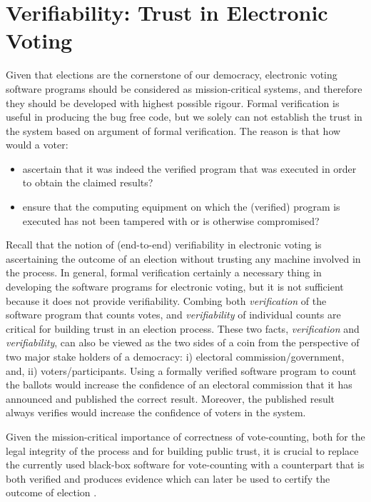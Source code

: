 	
	  
	 
		
 \section{Verifiability: Trust in Electronic Voting}
 \label{secback:varifiability}
 Given that elections are  the cornerstone of our democracy, 
   electronic voting software programs should be considered as mission-critical systems, 
   and therefore they should be developed with highest possible rigour. 
  Formal verification is useful in producing the 
   bug free code, but we solely can not 
   establish the trust in the system based on argument of 
   formal verification. The reason is that how would a voter:
   \begin{itemize}
   \item ascertain that it was indeed the verified program that was
	executed in order to obtain the claimed results?
	
   \item ensure that the computing equipment on which the (verified)
	program is executed has not been tampered with or is otherwise
	compromised?
	
   \end{itemize}
   
   \noindent
   
    Recall that the notion of (end-to-end) verifiability in electronic voting is
 ascertaining the outcome of an election without trusting any 
 machine involved in the process. 
   In general, formal verification certainly a necessary thing 
   in developing the software programs for electronic voting, 
   but it is not sufficient because it does not provide verifiability.
   Combing both \emph{verification} of the
	software program that counts votes, and
	\emph{verifiability} of individual counts are critical for
	building trust in an election process. These two facts, 
	 \emph{verification}  and \emph{verifiability}, 
	 can also be viewed as the
    two sides of a coin from the perspective of two major stake holders of 
    a democracy: i) electoral commission/government, and, ii) voters/participants.  
    Using a formally 
    verified software program to count the ballots would increase the confidence 
    of an electoral commission that it has announced and published the correct result. 
    Moreover,  the published result always verifies would increase the confidence
    of voters in the system. 
	 
	 
	Given the mission-critical importance of
	 correctness of vote-counting,
	both for the legal integrity of the process and for
	building public trust,  it is crucial to replace the
	currently used black-box software for vote-counting with a
	counterpart that is both verified and produces 
	evidence which can later be used to certify
	the outcome of election \citep{Bernhard:2017:PES} \citep{Rivest:2008:PTRS}.
	
